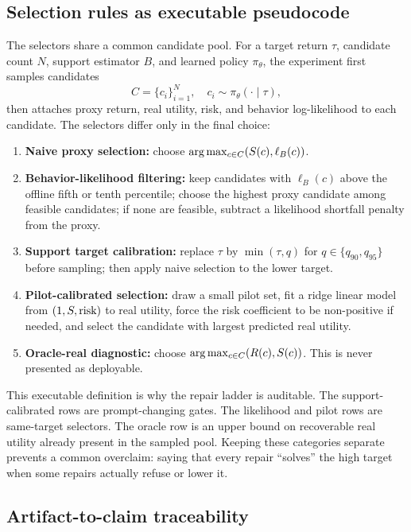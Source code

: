 \subsection{Selection rules as executable pseudocode}

The selectors share a common candidate pool. For a target return $\tau$, candidate count $N$, support estimator $B$, and learned policy $\pi_\theta$, the experiment first samples candidates
\[
  C=\{c_i\}_{i=1}^N,\quad c_i \sim \pi_\theta(\cdot\mid \tau),
\]
then attaches proxy return, real utility, risk, and behavior log-likelihood to each candidate. The selectors differ only in the final choice:

\begin{enumerate}
  \item \textbf{Naive proxy selection:} choose $\arg\max_{c\in C}(S(c), \ell_B(c))$.
  \item \textbf{Behavior-likelihood filtering:} keep candidates with $\ell_B(c)$ above the offline fifth or tenth percentile; choose the highest proxy candidate among feasible candidates; if none are feasible, subtract a likelihood shortfall penalty from the proxy.
  \item \textbf{Support target calibration:} replace $\tau$ by $\min(\tau, q)$ for $q\in\{q_{90},q_{95}\}$ before sampling; then apply naive selection to the lower target.
  \item \textbf{Pilot-calibrated selection:} draw a small pilot set, fit a ridge linear model from $(1,S,\text{risk})$ to real utility, force the risk coefficient to be non-positive if needed, and select the candidate with largest predicted real utility.
  \item \textbf{Oracle-real diagnostic:} choose $\arg\max_{c\in C}(R(c),S(c))$. This is never presented as deployable.
\end{enumerate}

This executable definition is why the repair ladder is auditable. The support-calibrated rows are prompt-changing gates. The likelihood and pilot rows are same-target selectors. The oracle row is an upper bound on recoverable real utility already present in the sampled pool. Keeping these categories separate prevents a common overclaim: saying that every repair ``solves'' the high target when some repairs actually refuse or lower it.

\subsection{Artifact-to-claim traceability}

